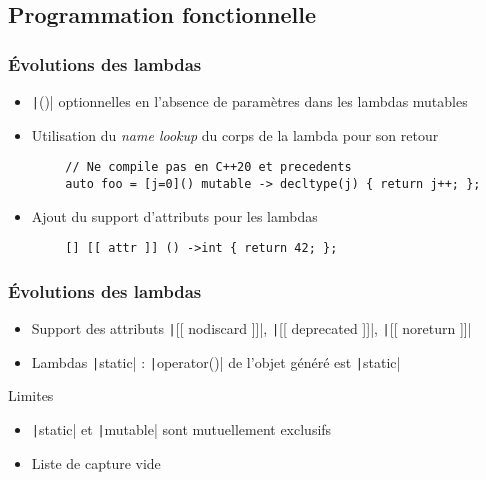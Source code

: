 \documentclass[C++.tex]{subfiles}
\begin{document}
\subsection*{Programmation fonctionnelle}
\begin{frame}[fragile]
	\frametitle{Évolutions des lambdas}
	\begin{itemize}
		\item \texttt|()| optionnelles en l'absence de paramètres dans les lambdas mutables


		\item Utilisation du \textit{name lookup} du corps de la lambda pour son retour
	\end{itemize}

	\begin{verbatim}
		// Ne compile pas en C++20 et precedents
		auto foo = [j=0]() mutable -> decltype(j) { return j++; };
	\end{verbatim}


	\begin{itemize}
		\item Ajout du support d'attributs pour les lambdas
	\end{itemize}

	\begin{verbatim}
		[] [[ attr ]] () ->int { return 42; };
	\end{verbatim}

\end{frame}

\begin{frame}[fragile]
	\frametitle{Évolutions des lambdas}
	\begin{itemize}
		\item Support des attributs \texttt|[[ nodiscard ]]|, \texttt|[[ deprecated ]]|, \texttt|[[ noreturn ]]|
		\item Lambdas \texttt|static| : \texttt|operator()| de l'objet généré est \texttt|static|
	\end{itemize}
	
	\begin{alertblock}{Limites}
		\begin{itemize}
			\item \texttt|static| et \texttt|mutable| sont mutuellement exclusifs
			\item Liste de capture vide
		\end{itemize}
	\end{alertblock}
\end{frame}
\end{document}
